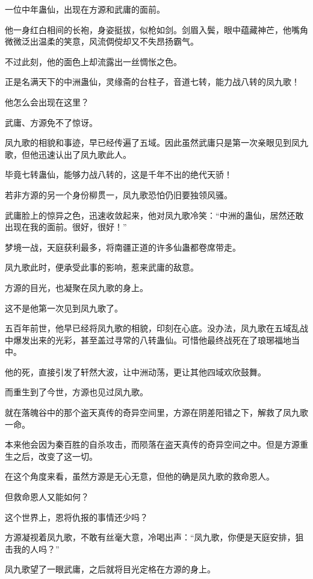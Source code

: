 
\begin{this_body}

一位中年蛊仙，出现在方源和武庸的面前。

他一身红白相间的长袍，身姿挺拔，似枪如剑。剑眉入鬓，眼中蕴藏神芒，他嘴角微微泛出温柔的笑意，风流倜傥却又不失昂扬霸气。

不过此刻，他的面色上却流露出一丝惆怅之色。

正是名满天下的中洲蛊仙，灵缘斋的台柱子，音道七转，能力战八转的凤九歌！

他怎么会出现在这里？

武庸、方源免不了惊讶。

凤九歌的相貌和事迹，早已经传遍了五域。因此虽然武庸只是第一次亲眼见到凤九歌，但他迅速认出了凤九歌此人。

毕竟七转蛊仙，能够力战八转的，这是千年不出的绝代天骄！

若非方源的另一个身份柳贯一，凤九歌恐怕仍旧要独领风骚。

武庸脸上的惊异之色，迅速收敛起来，他对凤九歌冷笑：“中洲的蛊仙，居然还敢出现在我的面前。很好，很好！”

梦境一战，天庭获利最多，将南疆正道的许多仙蛊都卷席带走。

凤九歌此时，便承受此事的影响，惹来武庸的敌意。

方源的目光，也凝聚在凤九歌的身上。

这不是他第一次见到凤九歌了。

五百年前世，他早已经将凤九歌的相貌，印刻在心底。没办法，凤九歌在五域乱战中爆发出来的光彩，甚至盖过寻常的八转蛊仙。可惜他最终战死在了琅琊福地当中。

他的死，直接引发了轩然大波，让中洲动荡，更让其他四域欢欣鼓舞。

而重生到了今世，方源也见过凤九歌。

就在落魄谷中的那个盗天真传的奇异空间里，方源在阴差阳错之下，解救了凤九歌一命。

本来他会因为秦百胜的自杀攻击，而陨落在盗天真传的奇异空间之中。但是方源重生之后，改变了这一切。

在这个角度来看，虽然方源是无心无意，但他的确是凤九歌的救命恩人。

但救命恩人又能如何？

这个世界上，恩将仇报的事情还少吗？

方源凝视着凤九歌，不敢有丝毫大意，冷喝出声：“凤九歌，你便是天庭安排，狙击我的人吗？”

凤九歌望了一眼武庸，之后就将目光定格在方源的身上。


\end{this_body}
